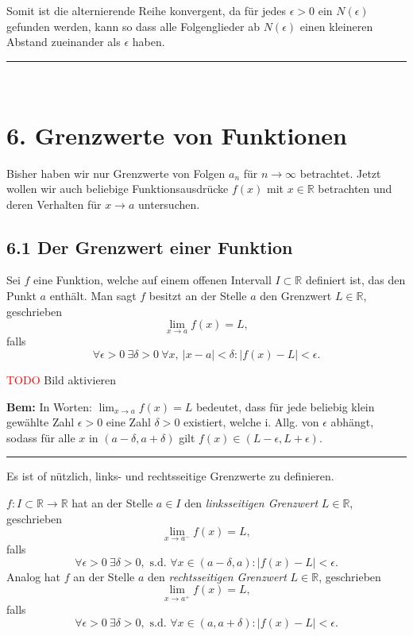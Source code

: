 \documentclass[a4paper,landscape,8pt]{extarticle}
\newcommand{\R}{\mathbb{R}}
\newcommand{\abs}[1]{\left\lvert #1 \right\rvert}
\newcommand{\todo}{\textcolor{red}{TODO }}
\newcommand{\sep}{\vspace{5pt}\noindent\hrule\vspace{5pt}}
\newcommand{\Bem}{\textbf{Bem: }}
\renewcommand*{\newpage}{ \ }
\begin{document}
\begin{multicols*}{4}
\begin{warmup}
Somit ist die alternierende Reihe konvergent, da für jedes $\epsilon>0$ ein
$N(\epsilon)$ gefunden werden, kann so dass alle Folgenglieder ab $N(\epsilon)$
einen kleineren Abstand zueinander als $\epsilon$ haben.

\sep
\end{warmup}


\newpage

\section{6. Grenzwerte von Funktionen}

Bisher haben wir nur Grenzwerte von Folgen $a_n$ für $n\to\infty$ betrachtet.
Jetzt wollen wir auch beliebige Funktionsausdrücke $f(x)$ mit $x\in\R$
betrachten und deren Verhalten für $x\to a$ untersuchen.

\subsection{6.1 Der Grenzwert einer Funktion}

\Def Sei $f$ eine Funktion, welche auf einem offenen Intervall $I\subset \R	$
definiert ist, das den Punkt $a$ enthält. Man sagt $f$ besitzt an der Stelle $a$
den Grenzwert $L\in \R$, geschrieben
\[
\lim_{x\to a} f(x) = L,
\]
falls
\[
\forall \epsilon > 0 \ \exists \delta > 0 \ \forall x, \ 
\abs{x-a}<\delta \colon \abs{f(x)-L}<\epsilon.
\]

\begin{warmup}
\todo{Bild aktivieren}
\end{warmup}

\Bem In Worten: $\lim_{x\to a} f(x)=L$ bedeutet, dass für jede beliebig klein
gewählte Zahl $\epsilon > 0$ eine Zahl $\delta > 0$ existiert, welche i. Allg.
von $\epsilon$ abhängt, sodass für alle $x$ in $(a - \delta, a + \delta)$ gilt
$f(x)\in (L-\epsilon, L+\epsilon)$.

\sep

Es ist of nützlich, links- und rechtsseitige Grenzwerte zu definieren.

\Def $f\colon I\subset \R \to \R$ hat an der Stelle $a\in I$ den
\emph{linksseitigen Grenzwert} $L\in\R$, geschrieben
\[
\lim_{x\to a^-} f(x) = L,
\]
falls
\[
\forall\epsilon > 0 \ \exists \delta >0, \text{ s.d. } \forall x\in(a-\delta,a)
\colon \abs{f(x)-L}<\epsilon.
\]
Analog hat $f$ an der Stelle $a$ den \emph{rechtsseitigen Grenzwert} $L\in\R$,
geschrieben
\[
\lim_{x\to a^+} f(x) = L,
\]
falls
\[
\forall\epsilon > 0 \ \exists \delta >0, \text{ s.d. } \forall
x\in(a,a+\delta) \colon \abs{f(x)-L}<\epsilon.
\]


\end{multicols*}
\end{document}
